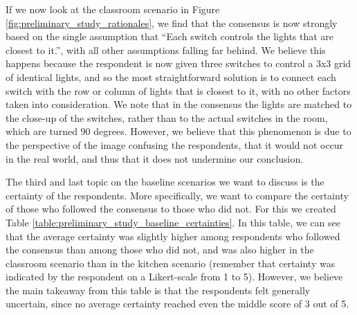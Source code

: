 

If we now look at the classroom scenario in Figure \ref{fig:preliminary_study_rationales}, we find that the consensus is now strongly based on the single assumption that ``Each switch controls the lights that are closest to it.'', with all other assumptions falling far behind. We believe this happens because the respondent is now given three switches to control a 3x3 grid of identical lights, and so the most straightforward solution is to connect each switch with the row or column of lights that is closest to it, with no other factors taken into consideration. We note that in the consensus the lights are matched to the close-up of the switches, rather than to the actual switches in the room, which are turned 90 degrees. However, we believe that this phenomenon is due to the perspective of the image confusing the respondents, that it would not occur in the real world, and thus that it does not undermine our conclusion.

The third and last topic on the baseline scenarios we want to discuss is the certainty of the respondents. More specifically, we want to compare the certainty of those who followed the consensus to those who did not. For this we created Table \ref{table:preliminary_study_baseline_certainties}. In this table, we can see that the average certainty was slightly higher among respondents who followed the consensus than among those who did not, and was also higher in the classroom scenario than in the kitchen scenario (remember that certainty was indicated by the respondent on a Likert-scale from 1 to 5). However, we believe the main takeaway from this table is that the respondents felt generally uncertain, since no average certainty reached even the middle score of 3 out of 5.

